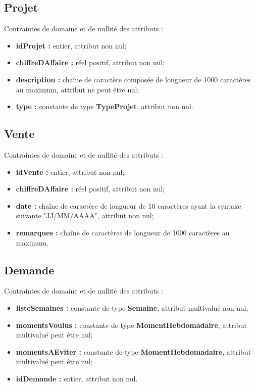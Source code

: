 \documentclass[asi, sansVersion]{picInsa}
\begin{document}
\subsection*{Projet}
Contraintes de domaine et de nullité des attributs :
\begin{itemize}
 	\item \textbf{idProjet :} entier, attribut non nul;
	\item \textbf{chiffreDAffaire :} réel positif, attribut non nul;
	\item \textbf{description :} chaîne de caractère composée de longueur de 1000 caractères au maximum, attribut ne peut être nul;
	\item \textbf{type :} constante de type \textbf{TypeProjet}, attribut non nul. \\  
\end{itemize} 

\subsection*{Vente}
Contraintes de domaine et de nullité des attributs :
\begin{itemize}
 	\item \textbf{idVente :} entier, attribut non nul;
	\item \textbf{chiffreDAffaire :} réel positif, attribut non nul;
	\item \textbf{date :} chaîne de caractère de longueur de 10 caractères ayant la syntaxe suivante "JJ/MM/AAAA", attribut non nul;
	\item \textbf{remarques :} chaîne de caractères de longueur de 1000 caractères au maximum. \\  
\end{itemize} 

\subsection*{Demande}
Contraintes de domaine et de nullité des attributs :
\begin{itemize}
 	\item \textbf{listeSemaines :} constante de type \textbf{Semaine}, attribut multivalué non nul; 
	\item \textbf{momentsVoulus :} constante de type \textbf{MomentHebdomadaire}, attribut multivalué peut être nul;
	\item \textbf{momentsAEviter :} constante de type \textbf{MomentHebdomadaire}, attribut multivalué peut être nul;
	\item \textbf{idDemande :} entier, attribut non nul.
\end{itemize} 
\end{document}
